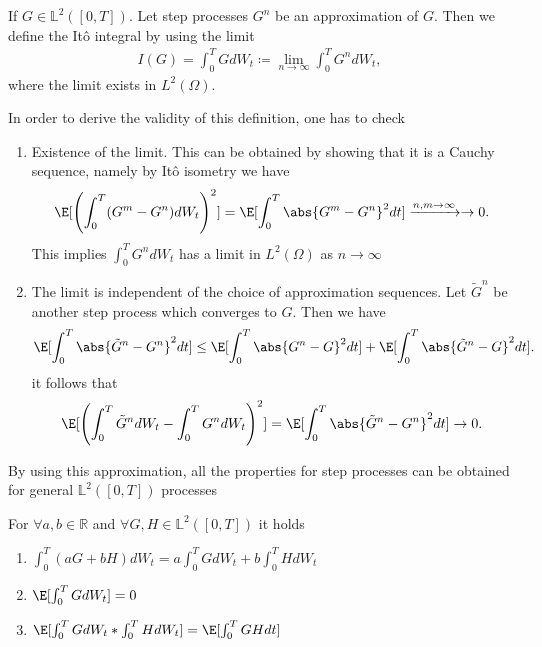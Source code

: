 \begin{definition}[It\^o Integral]\label{ito_integral}
  If $G \in  \mathbb{L}^2([0,T])$. Let step processes $G^{n} $ be an approximation of $G$. Then we define
  the It\^o  integral by using the limit 
  \begin{align*}
    I(G) = \int_0^{T} GdW_t \coloneqq  \lim_{n\to \infty} \int_0^{T} G^{n} dW_t
  ,\end{align*}
  where the limit exists in $L^2(\Omega)$.
\end{definition}
In order to derive the validity of this definition, one has to check 
\begin{enumerate}
  \item Existence of the limit. This can be obtained by showing that it is a Cauchy sequence, namely by It\^o isometry we have
    \begin{align*}
      \E[\left( \int_0^{T} (G^{m} - G^{n}  ) dW_t  \right)^2 ] = \E[\int_0^{T} \abs{G^{m} - G^{n}  }^2 dt] \xrightarrow{n,m\to \infty} \to 0
    .\end{align*}
    This implies $\int_0^{T} G^{n} dW_t  $ has a limit in $L^2(\Omega )$ as $n\to \infty$
  \item The limit is independent of the choice of approximation sequences.
    Let $\tilde{G}^{n}  $ be another step process which converges to $G$. Then we have 
    \begin{align*}
      \E[\int_0^{T} \abs{\tilde{G}^{n} - G^{n}   }^2 dt ] \le  \E[\int_0^{T} \abs{G^{n} - G }^2 dt ] + \E[\int_0^{T} \abs{\tilde{G}^{n} - G  }^2 dt ]
    .\end{align*}
    it follows that 
    \begin{align*}
      \E[\left( \int_0^{T} \tilde{G}^{n} dW_t - \int_0^{T} G^{n} dW_t      \right)^2 ] = \E[\int_0^{T} \abs{\tilde{G}^{n} - G^{n}   }^2 dt ] \to 0
    .\end{align*}
\end{enumerate}
By using this approximation, all the properties for step  processes can be obtained for general $\mathbb{L}^2([0,T])$ processes
\begin{theorem}
  For $\forall  a,b \in  \mathbb{R}$  and $\forall  G,H \in \mathbb{L}^2([0,T])$ it holds 
  \begin{enumerate}
    \item $\int_0^{T} (aG+bH) dW_t = a\int_0^{T} GdW_t + b\int_0^{T} H dW_t   $ 
    \item $\E[\int_0^{T} GdW_t ] = 0$
    \item $\E[\int_0^{T} GdW_t * \int_0^{T} HdW_t  ] = \E[\int_0^{T} GH dt ]$
  \end{enumerate}
\end{theorem}

